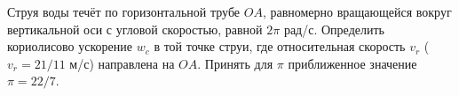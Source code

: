 Струя воды течёт по горизонтальной трубе $OA$,
равномерно вращающейся вокруг вертикальной оси
с угловой скоростью, равной $2\pi$ рад/с.
Определить кориолисово ускорение $w_c$ в той точке струи,
где относительная скорость $v_r$ ($v_r = 21/11$ м/с)
направлена на $OA$.
Принять для $\pi$ приближенное значение $\pi = 22/7$.
